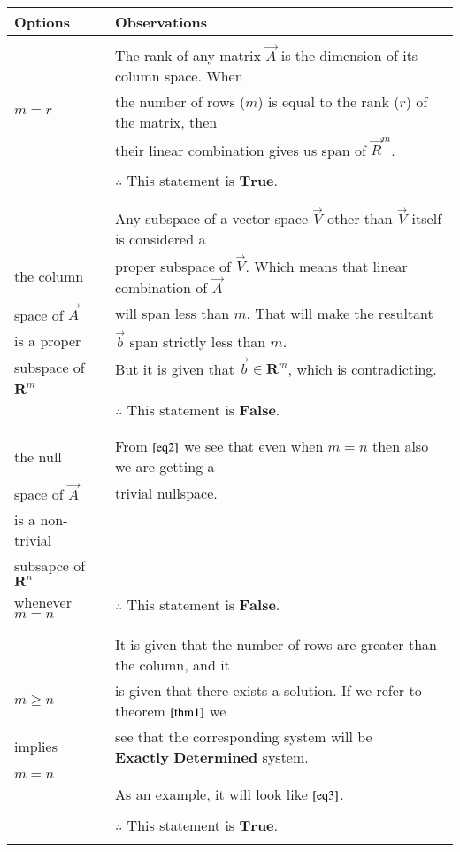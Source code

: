 \documentclass[journal,12pt,twocolumn]{IEEEtran}
\begin{document}
	\begin{table}[hp]
		\begin{tabular}{|l|l|}
			\hline
			Options & Observations\\
			\hline
			& \\
			& The rank of any matrix $\vec{A}$ is the dimension of its column space. When  \\
			$m = r$&  the number of rows ($m$) is equal to the rank ($r$) of the matrix, then \\
			&  their linear combination gives us span of $\vec{R}^{m}$.\\
			& \\
			& $\therefore$ This statement is $\textbf{True}$. \\
			& \\
			\hline 
			& \\
			& Any subspace of a vector space $\vec{V}$ other than $\vec{V}$ itself is considered a \\
			the column & proper subspace of $\vec{V}$. Which means that linear combination of $\vec{A}$\\
			space of $\vec{A}$ & will span less than $m$. That will make the resultant\\
			is a proper & $\vec{b}$ span strictly less than $m$.\\ 
			subspace of & But it is given that $\vec{b} \in \mathbf{R}^{m}$, which is contradicting.\\  
			$\mathbf{R}^{m}$ & \\
			& $\therefore$ This statement is $\textbf{False}$. \\
			& \\
			\hline
			& \\
			the null & From $\eqref{eq2}$ we see that even when $m = n$ then also we are getting a\\ 
			space of $\vec{A}$ & trivial nullspace. \\
			is a non-trivial& \\
			subsapce of $\mathbf{R}^{n}$& \\
			whenever $m=n$& $\therefore$ This statement is $\textbf{False}$. \\
			& \\
			\hline
			& \\
			& It is given that the number of rows are greater than the column, and it \\
			$m \geq n$ & is given that there exists a solution. If we refer to theorem $\eqref{thm1}$ we \\
			implies & see that the corresponding system will be $\textbf{Exactly Determined}$ system. \\
			$m=n$ & \\
			& As an example, it will look like $\eqref{eq3}$.\\
			& \\
			& $\therefore$ This statement is $\textbf{True}$. \\
			& \\
			\hline
		\end{tabular}
	\end{table}
	
\end{document}
